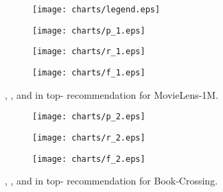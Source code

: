 \documentclass[sigconf]{acmart}
\begin{document}
		\begin{figure*}[t]
			\centering
			\begin{subfigure}[b]{0.9\textwidth}
				\vspace{-0.1in}
                \texttt{[image: charts/legend.eps]}
                \vspace{-0.3in}
            \end{subfigure}
            \hfill
            \begin{subfigure}[b]{0.3\textwidth}
                \texttt{[image: charts/p\_1.eps]}
                \caption{}
            \end{subfigure}
            \hfill
            \begin{subfigure}[b]{0.3\textwidth}
                \texttt{[image: charts/r\_1.eps]}
                \caption{}
            \end{subfigure}
            \hfill
            \begin{subfigure}[b]{0.3\textwidth}
                \texttt{[image: charts/f\_1.eps]}
                \caption{}
            \end{subfigure}
            \caption{, , and  in top- recommendation for MovieLens-1M.}
            \label{fig:topk_movie}
        \end{figure*}
        
        \begin{figure*}[t]
			\centering
            \begin{subfigure}[b]{0.3\textwidth}
                \texttt{[image: charts/p\_2.eps]}
                \caption{}
            \end{subfigure}
            \hfill
            \begin{subfigure}[b]{0.3\textwidth}
                \texttt{[image: charts/r\_2.eps]}
                \caption{}
            \end{subfigure}
            \hfill
            \begin{subfigure}[b]{0.3\textwidth}
                \texttt{[image: charts/f\_2.eps]}
                \caption{}
            \end{subfigure}
            \caption{, , and  in top- recommendation for Book-Crossing.}
            \label{fig:topk_book}
        \end{figure*}
        
\end{document}
